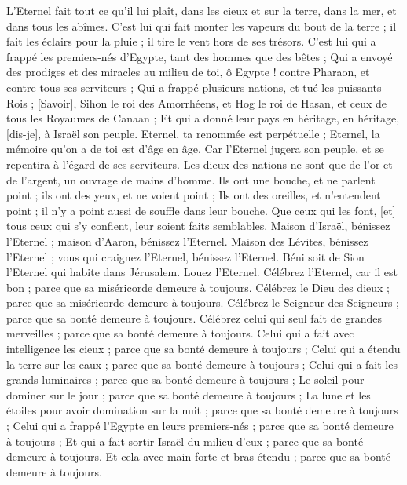 \begin{multicols}{2}
L'Eternel fait tout ce qu'il lui plaît, dans les cieux et sur la terre, dans la mer, et dans tous les abîmes.
C'est lui qui fait monter les vapeurs du bout de la terre ; il fait les éclairs pour la pluie ; il tire le vent hors de ses trésors.
C'est lui qui a frappé les premiers-nés d'Egypte, tant des hommes que des bêtes ;
Qui a envoyé des prodiges et des miracles au milieu de toi, ô Egypte ! contre Pharaon, et contre tous ses serviteurs ;
Qui a frappé plusieurs nations, et tué les puissants Rois ;
[Savoir], Sihon le roi des Amorrhéens, et Hog le roi de Hasan, et ceux de tous les Royaumes de Canaan ;
Et qui a donné leur pays en héritage, en héritage, [dis-je], à Israël son peuple.
Eternel, ta renommée est perpétuelle ; Eternel, la mémoire qu'on a de toi est d'âge en âge.
Car l'Eternel jugera son peuple, et se repentira à l'égard de ses serviteurs.
Les dieux des nations ne sont que de l'or et de l'argent, un ouvrage de mains d'homme.
Ils ont une bouche, et ne parlent point ; ils ont des yeux, et ne voient point ;
Ils ont des oreilles, et n'entendent point ; il n'y a point aussi de souffle dans leur bouche.
Que ceux qui les font, [et] tous ceux qui s'y confient, leur soient faits semblables.
Maison d'Israël, bénissez l'Eternel ; maison d'Aaron, bénissez l'Eternel.
Maison des Lévites, bénissez l'Eternel ; vous qui craignez l'Eternel, bénissez l'Eternel.
Béni soit de Sion l'Eternel qui habite dans Jérusalem. Louez l'Eternel.
\VerseOne{}Célébrez l'Eternel, car il est bon ; parce que sa miséricorde demeure à toujours.
Célébrez le Dieu des dieux ; parce que sa miséricorde demeure à toujours.
Célébrez le Seigneur des Seigneurs ; parce que sa bonté demeure à toujours.
Célébrez celui qui seul fait de grandes merveilles ; parce que sa bonté demeure à toujours.
Celui qui a fait avec intelligence les cieux ; parce que sa bonté demeure à toujours ;
Celui qui a étendu la terre sur les eaux ; parce que sa bonté demeure à toujours ;
Celui qui a fait les grands luminaires ; parce que sa bonté demeure à toujours ;
Le soleil pour dominer sur le jour ; parce que sa bonté demeure à toujours ;
La lune et les étoiles pour avoir domination sur la nuit ; parce que sa bonté demeure à toujours ;
Celui qui a frappé l'Egypte en leurs premiers-nés ; parce que sa bonté demeure à toujours ;
Et qui a fait sortir Israël du milieu d'eux ; parce que sa bonté demeure à toujours.
Et cela avec main forte et bras étendu ; parce que sa bonté demeure à toujours.

\end{multicols}
